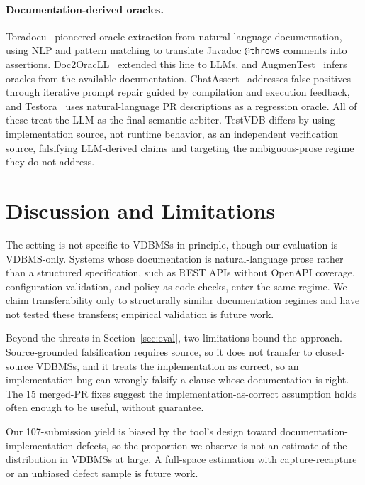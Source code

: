 \documentclass[sigconf]{acmart}
\begin{document}
\paragraph{Documentation-derived oracles.}
Toradocu~\cite{toradocu16} pioneered oracle extraction from natural-language documentation, using NLP and pattern matching to translate Javadoc \texttt{@throws} comments into assertions. Doc2OracLL~\cite{doc2oracll25} extended this line to LLMs, and AugmenTest~\cite{augmentest25} infers oracles from the available documentation. ChatAssert~\cite{chatassert24} addresses false positives through iterative prompt repair guided by compilation and execution feedback, and Testora~\cite{testora26} uses natural-language PR descriptions as a regression oracle. All of these treat the LLM as the final semantic arbiter. TestVDB differs by using implementation source, not runtime behavior, as an independent verification source, falsifying LLM-derived claims and targeting the ambiguous-prose regime they do not address.

\section{Discussion and Limitations}
\label{sec:disc}

The setting is not specific to VDBMSs in principle, though our evaluation is VDBMS-only. Systems whose documentation is natural-language prose rather than a structured specification, such as REST APIs without OpenAPI coverage, configuration validation, and policy-as-code checks, enter the same regime. We claim transferability only to structurally similar documentation regimes and have not tested these transfers; empirical validation is future work.

Beyond the threats in Section~\ref{sec:eval}, two limitations bound the approach. Source-grounded falsification requires source, so it does not transfer to closed-source VDBMSs, and it treats the implementation as correct, so an implementation bug can wrongly falsify a clause whose documentation is right. The 15 merged-PR fixes suggest the implementation-as-correct assumption holds often enough to be useful, without guarantee.

Our 107-submission yield is biased by the tool's design toward documentation-implementation defects, so the proportion we observe is not an estimate of the distribution in VDBMSs at large. A full-space estimation with capture-recapture or an unbiased defect sample is future work.
\end{document}
